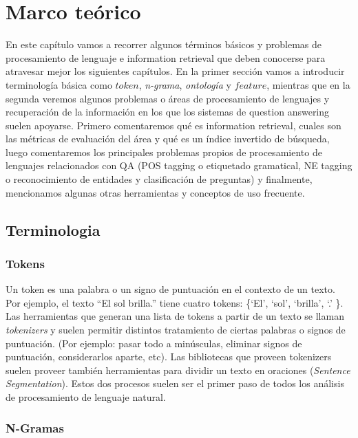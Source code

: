 \chapter{Marco teórico}
\label{chap:teorico}

En este capítulo vamos a recorrer algunos términos básicos y problemas de procesamiento de lenguaje e information retrieval que deben conocerse para atravesar mejor los siguientes capítulos. En la primer sección vamos a introducir terminología básica como $token$, \textit{n-grama}, \textit{ontología} y $feature$, mientras que en la segunda veremos algunos problemas o áreas de procesamiento de lenguajes y recuperación de la información en los que los sistemas de question answering suelen apoyarse. Primero comentaremos qué es information retrieval, cuales son las métricas de evaluación del área y qué es un índice invertido de búsqueda, luego comentaremos los principales problemas propios de procesamiento de lenguajes relacionados con QA (POS tagging o etiquetado gramatical, NE tagging o reconocimiento de entidades y clasificación de preguntas) y finalmente, mencionamos algunas otras herramientas y conceptos de uso frecuente. 

\section{Terminologia}
\label{sec:terminologia}
\subsection*{Tokens}

Un token es una palabra o un signo de puntuación en el contexto de un
texto.
Por ejemplo, el texto {\textquotedblleft}El sol
brilla.{\textquotedblright} tiene cuatro tokens:
\{{\textquoteleft}El{\textquoteright}, {\textquoteleft}sol{\textquoteright}, {\textquoteleft}brilla{\textquoteright}, {\textquoteleft}.{\textquoteright} \}. 
Las herramientas que generan una lista de tokens a partir de un texto se llaman
\textit{tokenizers} y suelen permitir distintos tratamiento de ciertas
palabras o signos de puntuación. (Por ejemplo: pasar todo a minúsculas, eliminar signos de puntuación, considerarlos aparte, etc).
Las bibliotecas que proveen tokenizers suelen proveer también herramientas para dividir un texto en
oraciones (\textit{Sentence Segmentation}). 
Estos dos procesos suelen ser el primer paso de todos los análisis de procesamiento de lenguaje natural.


\subsection*{N-Gramas}

